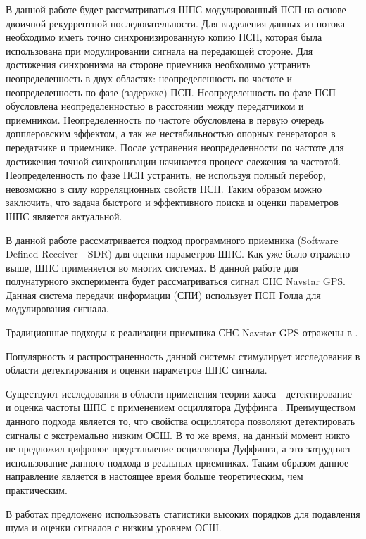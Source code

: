 В данной работе будет рассматриваться ШПС модулированный ПСП на основе двоичной рекуррентной последовательности.
Для выделения данных из потока необходимо иметь точно синхронизированную копию ПСП, которая была использована
при модулировании сигнала на передающей стороне. Для достижения синхронизма на стороне приемника необходимо
устранить неопределенность в двух областях: неопределенность по частоте и неопределенность по фазе (задержке) ПСП.
Неопределенность по фазе ПСП обусловлена неопределенностью в расстоянии между передатчиком и приемником. Неопределенность
по частоте обусловлена в первую очередь допплеровским эффектом, а так же нестабильностью опорных генераторов в
передатчике и приемнике. После устранения неопределенности по частоте для достижения точной синхронизации
начинается процесс слежения за частотой. Неопределенность по фазе ПСП устранить, не используя полный перебор,
невозможно в силу корреляционных свойств ПСП. Таким образом можно заключить, что задача быстрого и эффективного
поиска и оценки параметров ШПС является актуальной.

В данной работе рассматривается подход программного приемника (Software Defined Receiver - SDR)
\cite{akos-book, grayver-book, pany-book} для оценки параметров ШПС. Как уже было отражено выше, ШПС применяется во
многих системах. В данной работе для полунатурного эксперимента будет рассматриваться сигнал СНС Navstar GPS. Данная система передачи 
информации (СПИ) использует ПСП Голда \cite{gold-ieee} для модулирования сигнала.

Традиционные подходы к реализации приемника СНС Navstar GPS отражены в \cite{akos-book, tsui}. 

Популярность и распространенность данной системы стимулирует исследования в области детектирования
и оценки параметров ШПС сигнала.

Существуют исследования в области применения теории хаоса - детектирование и оценка
частоты ШПС с применением осциллятора Дуффинга \cite{chaos_cambridge, chaos_chen, chaos_huang, chaos_wang}. Преимуществом
данного подхода является то, что свойства осциллятора позволяют детектировать сигналы с экстремально низким ОСШ. В то же
время, на данный момент никто не предложил цифровое представление осциллятора Дуффинга, а это затрудняет использование данного подхода
в реальных приемниках. Таким образом данное направление является в настоящее время больше теоретическим, чем практическим.

В работах \cite{hos_petropulu, hos_zhao} предложено использовать статистики высоких порядков для подавления шума и оценки
сигналов с низким уровнем ОСШ.


